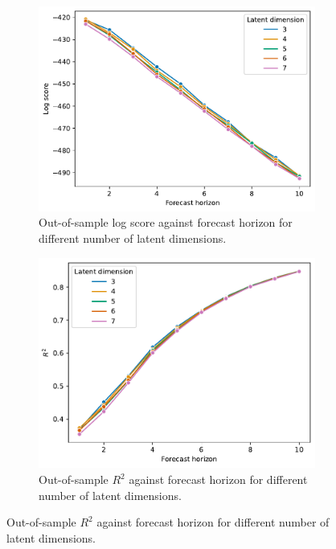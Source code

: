 \documentclass[preprint,12pt]{elsarticle}
\begin{document}
\begin{figure}
    \centering
    \begin{subfigure}[b]{0.45\textwidth}
        \centering
        \includegraphics[width=\textwidth]{figs/latent_dim_comparison.pdf}
        \caption{Out-of-sample log score against forecast horizon for different number of latent dimensions.}
        \label{fig:model_evaluation_sweden_logscore}
    \end{subfigure}
    \hfill
    \begin{subfigure}[b]{0.45\textwidth}
        \centering
        \includegraphics[width=\textwidth]{figs/latent_dim_comparison_R2.pdf}
        \caption{Out-of-sample $R^2$ against forecast horizon for different number of latent dimensions.}

\end{subfigure}
\end{figure}
\end{document}
